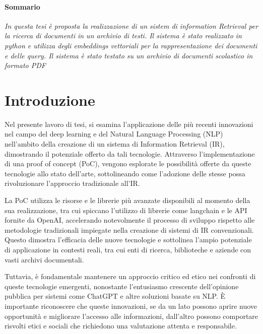 
\paragraph{Sommario} 
\textit{
    In questa tesi è proposta la realizzazione di un sistem di information Retrieval per la ricerca di documenti in un archivio di testi.
    Il sistema è stato realizzato in python e utilizza degli embeddings vettoriali per la rappresentazione dei documenti e delle query. 
    Il sistema è stato testato su un archivio di documenti scolastico in formato PDF
 }

\section*{Introduzione}
Nel presente lavoro di tesi, si esamina l'applicazione delle più recenti innovazioni nel campo del deep learning e del Natural Language Processing (NLP) nell'ambito della creazione di un sistema di Information Retrieval (IR), dimostrando il potenziale offerto da tali tecnologie. Attraverso l'implementazione di una proof of concept (PoC), vengono esplorate le possibilità offerte da queste tecnologie allo stato dell'arte, sottolineando come l'adozione delle stesse possa rivoluzionare l'approccio tradizionale all'IR.

La PoC utilizza le risorse e le librerie più avanzate disponibili al momento della sua realizzazione, tra cui spiccano l'utilizzo di librerie come langchain e le API fornite da OpenAI, accelerando notevolmente il processo di sviluppo rispetto alle metodologie tradizionali impiegate nella creazione di sistemi di IR convenzionali. Questo dimostra l'efficacia delle nuove tecnologie e sottolinea l'ampio potenziale di applicazione in contesti reali, tra cui enti di ricerca, biblioteche e aziende con vasti archivi documentali.

Tuttavia, è fondamentale mantenere un approccio critico ed etico nei confronti di queste tecnologie emergenti, nonostante l'entusiasmo crescente dell'opinione pubblica per sistemi come ChatGPT e altre soluzioni basate su NLP. È importante riconoscere che queste innovazioni, se da un lato possono aprire nuove opportunità e migliorare l'accesso alle informazioni, dall'altro possono comportare risvolti etici e sociali che richiedono una valutazione attenta e responsabile.